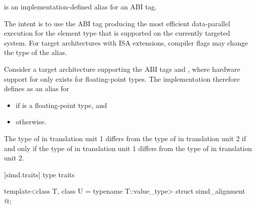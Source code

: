 
\pnum
{} is an implementation-defined alias for an ABI tag.
\begin{note}
The intent is to use the ABI tag producing the most efficient data-parallel
execution for the element type  that is supported on the currently
targeted system.
For target architectures with ISA extensions, compiler flags may change the
type of the  alias.
\end{note}
\begin{example}
  Consider a target architecture supporting the ABI tags
   and , where hardware support for
   only exists for floating-point types.
  The implementation therefore defines  as an alias for
  \begin{itemize}
    \item {} if  is a floating-point type, and
    \item {} otherwise.
  \end{itemize}
\end{example}

\pnum\label{wording.deducet}
The type of  in translation unit 1 differs from the type
of  in translation unit 2 if and only if the type of
 in translation unit 1 differs from the type of
 in translation unit 2.

[simd.traits]{ type traits}

\begin{itemdecl}
template<class T, class U = typename T::value_type> struct simd_alignment { @\seebelow@ };
\end{itemdecl}

